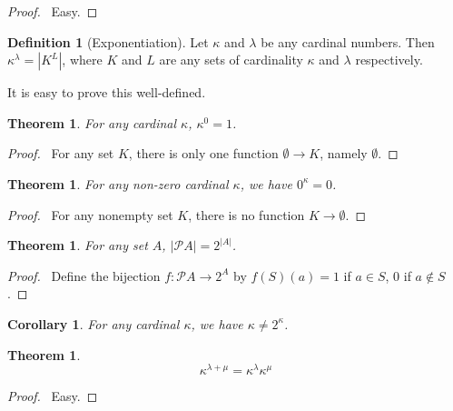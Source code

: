 \documentclass{article}
\let\qed\relax
\newtheorem{theorem}[axiom]{Theorem}
\newtheorem{corollary}{Corollary}[axiom]
\theoremstyle{definition}
\newtheorem{definition}[axiom]{Definition}
\begin{document}
    \begin{proof}
        \pf\ Easy. \qed
    \end{proof}

    \begin{definition}[Exponentiation]
        Let $\kappa$ and $\lambda$ be any cardinal numbers. Then $\kappa^\lambda = |K^L|$,
        where $K$ and $L$ are any sets of cardinality $\kappa$ and $\lambda$ respectively.
    \end{definition}

    It is easy to prove this well-defined.

    \begin{theorem}
        For any cardinal $\kappa$, $\kappa^0 = 1$.
    \end{theorem}

    \begin{proof}
        \pf\ For any set $K$, there is only one function $\emptyset \rightarrow K$, namely $\emptyset$. \qed
    \end{proof}

    \begin{theorem}
        For any non-zero cardinal $\kappa$, we have $0^\kappa = 0$.
    \end{theorem}

    \begin{proof}
        \pf\ For any nonempty set $K$, there is no function $K \rightarrow \emptyset$. \qed
    \end{proof}

    \begin{theorem}
        For any set $A$, $|\mathcal{P} A| = 2^{|A|}$.
    \end{theorem}

    \begin{proof}
        \pf\ Define the bijection $f : \mathcal{P} A \rightarrow 2^A$ by $f(S)(a) = 1$ if $a \in S$,
        0 if $a \notin S$. \qed
    \end{proof}

    \begin{corollary}
        For any cardinal $\kappa$, we have $\kappa \neq 2^\kappa$.
    \end{corollary}

    \begin{theorem}
        \[ \kappa^{\lambda + \mu} = \kappa^\lambda \kappa^\mu \]
    \end{theorem}

    \begin{proof}
        \pf\ Easy. \qed
    \end{proof}
\end{document}
